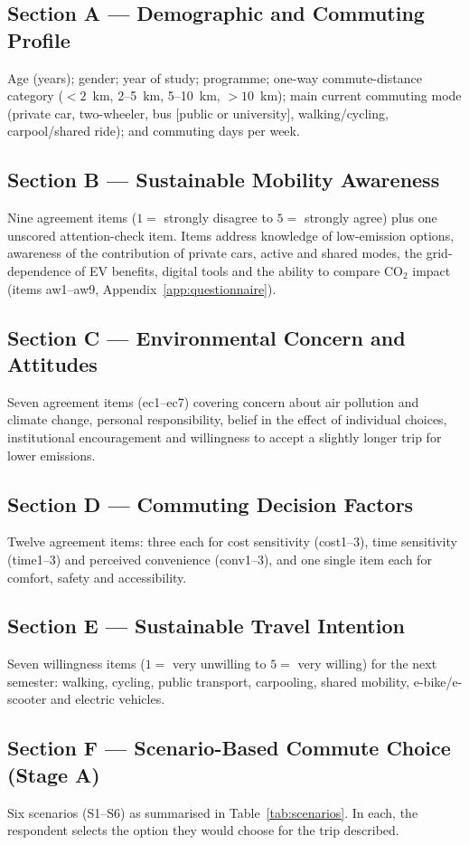 \documentclass[11pt,a4paper]{article}
\begin{document}
\subsection{Section A --- Demographic and Commuting Profile}
Age (years); gender; year of study; programme; one-way commute-distance category ($<2$~km, 2--5~km,
5--10~km, $>10$~km); main current commuting mode (private car, two-wheeler, bus [public or
university], walking/cycling, carpool/shared ride); and commuting days per week.

\subsection{Section B --- Sustainable Mobility Awareness}
Nine agreement items ($1 =$ strongly disagree to $5 =$ strongly agree) plus one unscored
attention-check item. Items address knowledge of low-emission options, awareness of the contribution
of private cars, active and shared modes, the grid-dependence of EV benefits, digital tools and the
ability to compare CO$_2$ impact (items aw1--aw9, Appendix~\ref{app:questionnaire}).

\subsection{Section C --- Environmental Concern and Attitudes}
Seven agreement items (ec1--ec7) covering concern about air pollution and climate change, personal
responsibility, belief in the effect of individual choices, institutional encouragement and
willingness to accept a slightly longer trip for lower emissions.

\subsection{Section D --- Commuting Decision Factors}
Twelve agreement items: three each for cost sensitivity (cost1--3), time sensitivity (time1--3) and
perceived convenience (conv1--3), and one single item each for comfort, safety and accessibility.

\subsection{Section E --- Sustainable Travel Intention}
Seven willingness items ($1 =$ very unwilling to $5 =$ very willing) for the next semester: walking,
cycling, public transport, carpooling, shared mobility, e-bike/e-scooter and electric vehicles.

\subsection{Section F --- Scenario-Based Commute Choice (Stage A)}
Six scenarios (S1--S6) as summarised in Table~\ref{tab:scenarios}. In each, the respondent selects the
option they would choose for the trip described.
\end{document}
